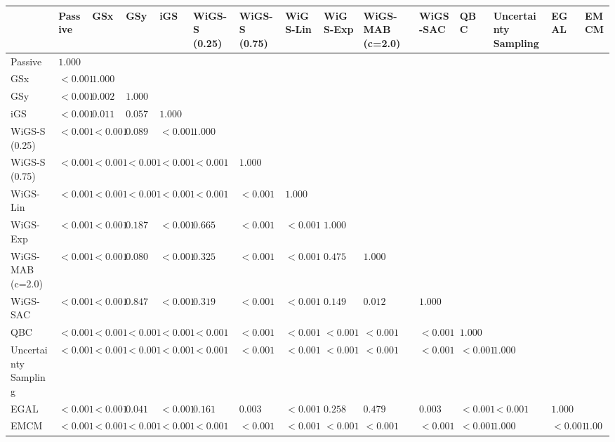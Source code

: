 \begin{tabular}{lllllllllllllll}
\toprule
 & Passive & GSx & GSy & iGS & WiGS-S (0.25) & WiGS-S (0.75) & WiGS-Lin & WiGS-Exp & WiGS-MAB (c=2.0) & WiGS-SAC & QBC & Uncertainty Sampling & EGAL & EMCM \\
\midrule
Passive & $1.000$ &  &  &  &  &  &  &  &  &  &  &  &  &  \\
GSx & $<0.001$ & $1.000$ &  &  &  &  &  &  &  &  &  &  &  &  \\
GSy & $<0.001$ & $0.002$ & $1.000$ &  &  &  &  &  &  &  &  &  &  &  \\
iGS & $<0.001$ & $0.011$ & $0.057$ & $1.000$ &  &  &  &  &  &  &  &  &  &  \\
WiGS-S (0.25) & $<0.001$ & $<0.001$ & $0.089$ & $<0.001$ & $1.000$ &  &  &  &  &  &  &  &  &  \\
WiGS-S (0.75) & $<0.001$ & $<0.001$ & $<0.001$ & $<0.001$ & $<0.001$ & $1.000$ &  &  &  &  &  &  &  &  \\
WiGS-Lin & $<0.001$ & $<0.001$ & $<0.001$ & $<0.001$ & $<0.001$ & $<0.001$ & $1.000$ &  &  &  &  &  &  &  \\
WiGS-Exp & $<0.001$ & $<0.001$ & $0.187$ & $<0.001$ & $0.665$ & $<0.001$ & $<0.001$ & $1.000$ &  &  &  &  &  &  \\
WiGS-MAB (c=2.0) & $<0.001$ & $<0.001$ & $0.080$ & $<0.001$ & $0.325$ & $<0.001$ & $<0.001$ & $0.475$ & $1.000$ &  &  &  &  &  \\
WiGS-SAC & $<0.001$ & $<0.001$ & $0.847$ & $<0.001$ & $0.319$ & $<0.001$ & $<0.001$ & $0.149$ & $0.012$ & $1.000$ &  &  &  &  \\
QBC & $<0.001$ & $<0.001$ & $<0.001$ & $<0.001$ & $<0.001$ & $<0.001$ & $<0.001$ & $<0.001$ & $<0.001$ & $<0.001$ & $1.000$ &  &  &  \\
Uncertainty Sampling & $<0.001$ & $<0.001$ & $<0.001$ & $<0.001$ & $<0.001$ & $<0.001$ & $<0.001$ & $<0.001$ & $<0.001$ & $<0.001$ & $<0.001$ & $1.000$ &  &  \\
EGAL & $<0.001$ & $<0.001$ & $0.041$ & $<0.001$ & $0.161$ & $0.003$ & $<0.001$ & $0.258$ & $0.479$ & $0.003$ & $<0.001$ & $<0.001$ & $1.000$ &  \\
EMCM & $<0.001$ & $<0.001$ & $<0.001$ & $<0.001$ & $<0.001$ & $<0.001$ & $<0.001$ & $<0.001$ & $<0.001$ & $<0.001$ & $<0.001$ & $1.000$ & $<0.001$ & $1.000$ \\
\bottomrule
\end{tabular}
